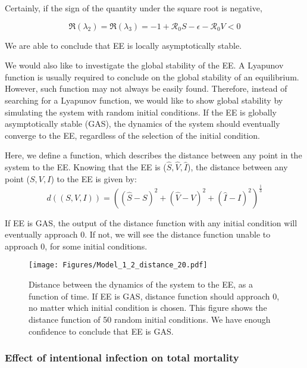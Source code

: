 \documentclass[12pt]{article}
\newcommand{\R}{\mathcal{R}}
\begin{document}
Certainly, if the sign of the quantity under the square root is negative,
\begin{linenomath*}
\begin{equation}
\Re(\lambda_2)=\Re(\lambda_3)=-1+\R_0 S-\epsilon-\R_0 V<0
\end{equation}
\end{linenomath*}

We are able to conclude that EE is locally asymptotically stable.

We would also like to investigate the global stability of the EE. A Lyapunov function is usually required to conclude on the global stability of an equilibrium. However, such function may not always be easily found. Therefore, instead of searching for a Lyapunov function, we would like to show global stability by simulating the system with random initial conditions. If the EE is globally asymptotically stable (GAS), the dynamics of the system should eventually converge to the EE, regardless of the selection of the initial condition.

Here, we define a function, which describes the distance between any point in the system to the EE. Knowing that the EE is ($\hat{S}, \hat{V},\hat{I}$), the distance between any point ($S,V,I$) to the EE is given by:
\begin{equation}
d((S,V,I))=((\hat{S}-S)^2+(\hat{V}-V)^2+(\hat{I}-I)^2)^{\frac{1}{3}}
\end{equation}

If EE is GAS, the output of the distance function with any initial condition will eventually approach 0. If not, we will see the distance function unable to approach 0, for some initial conditions.

\begin{figure}[H]
  \centering
  \texttt{[image: Figures/Model\_1\_2\_distance\_20.pdf]}
  \caption{Distance between the dynamics of the system to the EE, as a function of time. If EE is GAS, distance function should approach 0, no matter which initial condition is chosen. This figure shows the distance function of 50 random initial conditions. We have enough confidence to conclude that EE is GAS.}
\end{figure}

\subsubsection{Effect of intentional infection on total mortality}\label{section2.2.3}
\end{document}

